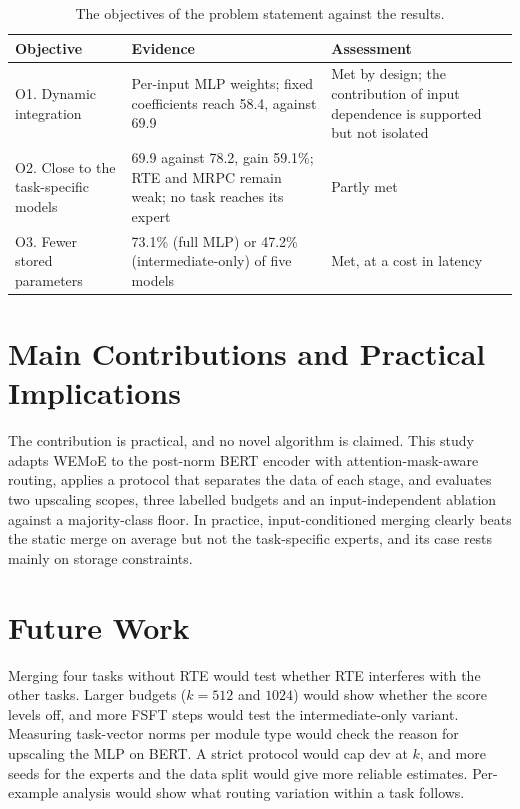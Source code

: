 \begin{table}[htbp]
  \centering\tablestyle
  \caption{The objectives of the problem statement against the results.}
  \label{tab:goals}
  \begin{tabularx}{\linewidth}{>{\raggedright\arraybackslash}p{3.2cm} X >{\raggedright\arraybackslash}p{5.2cm}}
    \toprule
    Objective & Evidence & Assessment\\
    \midrule
    O1. Dynamic integration & Per-input MLP weights; fixed coefficients reach 58.4, against 69.9 & Met by design; the contribution of input dependence is supported but not isolated\\
    O2. Close to the task-specific models & 69.9 against 78.2, gain 59.1\%; RTE and MRPC remain weak; no task reaches its expert & Partly met\\
    O3. Fewer stored parameters & 73.1\% (full MLP) or 47.2\% (intermediate-only) of five models & Met, at a cost in latency\\
    \bottomrule
  \end{tabularx}
\end{table}

\section{Main Contributions and Practical Implications}

The contribution is practical, and no novel algorithm is claimed. This study adapts WEMoE to the post-norm BERT encoder with attention-mask-aware routing, applies a protocol that separates the data of each stage, and evaluates two upscaling scopes, three labelled budgets and an input-independent ablation against a majority-class floor. In practice, input-conditioned merging clearly beats the static merge on average but not the task-specific experts, and its case rests mainly on storage constraints.

\section{Future Work}

Merging four tasks without RTE would test whether RTE interferes with the other tasks. Larger budgets ($k=512$ and $1024$) would show whether the score levels off, and more FSFT steps would test the intermediate-only variant. Measuring task-vector norms per module type would check the reason for upscaling the MLP on BERT. A strict protocol would cap dev at $k$, and more seeds for the experts and the data split would give more reliable estimates. Per-example analysis would show what routing variation within a task follows.
